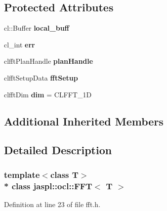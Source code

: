 \subsection*{Protected Attributes}
\begin{DoxyCompactItemize}
\item 
cl\+::\+Buffer {\bfseries local\+\_\+buff}\hypertarget{classjaspl_1_1ocl_1_1_f_f_t_a98f39cb75f2d5676c1ffb82c0006422a}{}\label{classjaspl_1_1ocl_1_1_f_f_t_a98f39cb75f2d5676c1ffb82c0006422a}

\item 
cl\+\_\+int {\bfseries err}\hypertarget{classjaspl_1_1ocl_1_1_f_f_t_a95822ff6ad0e6fa90f03f69794f2c650}{}\label{classjaspl_1_1ocl_1_1_f_f_t_a95822ff6ad0e6fa90f03f69794f2c650}

\item 
clfft\+Plan\+Handle {\bfseries plan\+Handle}\hypertarget{classjaspl_1_1ocl_1_1_f_f_t_aaeaaa3e6875893f5c93af695a8fad890}{}\label{classjaspl_1_1ocl_1_1_f_f_t_aaeaaa3e6875893f5c93af695a8fad890}

\item 
clfft\+Setup\+Data {\bfseries fft\+Setup}\hypertarget{classjaspl_1_1ocl_1_1_f_f_t_a018175fb482ddf655703b93f147f7158}{}\label{classjaspl_1_1ocl_1_1_f_f_t_a018175fb482ddf655703b93f147f7158}

\item 
clfft\+Dim {\bfseries dim} = C\+L\+F\+F\+T\+\_\+1D\hypertarget{classjaspl_1_1ocl_1_1_f_f_t_a7e10d500e11853871143a81a842b6e07}{}\label{classjaspl_1_1ocl_1_1_f_f_t_a7e10d500e11853871143a81a842b6e07}

\end{DoxyCompactItemize}
\subsection*{Additional Inherited Members}


\subsection{Detailed Description}
\subsubsection*{template$<$class T$>$\\*
class jaspl\+::ocl\+::\+F\+F\+T$<$ T $>$}



Definition at line 23 of file fft.\+h.


